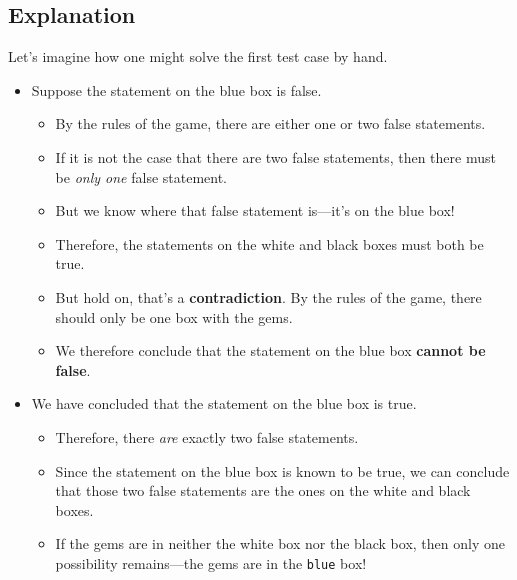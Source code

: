 \subsection*{Explanation}
Let's imagine how one might solve the first test case by hand.
\begin{itemize}
    \item Suppose the statement on the blue box is false.
    \begin{itemize}[label=$\circ$]
        \item By the rules of the game, there are either one or two false statements.
        \item If it is not the case that there are two false statements, then there must be \textit{only one} false statement.
        \item But we know where that false statement is---it's on the blue box!
        \item Therefore, the statements on the white and black boxes must both be true.
        \item But hold on, that's a \textbf{contradiction}.  By the rules of the game, there should only be one box with the gems.
        \item We therefore conclude that the statement on the blue box \textbf{cannot be false}.
    \end{itemize}
    \item We have concluded that the statement on the blue box is true.
        \begin{itemize}[label=$\circ$]
        \item Therefore, there \textit{are} exactly two false statements.
        \item Since the statement on the blue box is known to be true, we can conclude that those two false statements are the ones on the white and black boxes.
        \item If the gems are in neither the white box nor the black box, then only one possibility remains---the gems are in the \texttt{blue} box!
    \end{itemize}
\end{itemize}

\newpage

